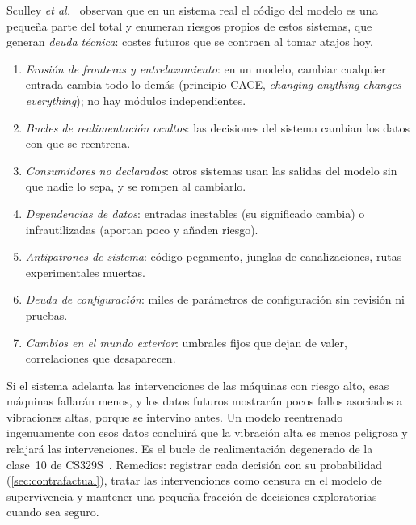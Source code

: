 Sculley \emph{et al.}~\cite{sculley} observan que en un sistema real el código del modelo es una pequeña parte del total y enumeran riesgos propios de estos sistemas, que generan \emph{deuda técnica}: costes futuros que se contraen al tomar atajos hoy.

\begin{definicion}\label{def:deuda}
\begin{enumerate}[label=(\alph*)]
  \item \emph{Erosión de fronteras y entrelazamiento}: en un modelo, cambiar cualquier entrada cambia todo lo demás (principio CACE, \emph{changing anything changes everything}); no hay módulos independientes.
  \item \emph{Bucles de realimentación ocultos}: las decisiones del sistema cambian los datos con que se reentrena.
  \item \emph{Consumidores no declarados}: otros sistemas usan las salidas del modelo sin que nadie lo sepa, y se rompen al cambiarlo.
  \item \emph{Dependencias de datos}: entradas inestables (su significado cambia) o infrautilizadas (aportan poco y añaden riesgo).
  \item \emph{Antipatrones de sistema}: código pegamento, junglas de canalizaciones, rutas experimentales muertas.
  \item \emph{Deuda de configuración}: miles de parámetros de configuración sin revisión ni pruebas.
  \item \emph{Cambios en el mundo exterior}: umbrales fijos que dejan de valer, correlaciones que desaparecen.
\end{enumerate}
\end{definicion}

\begin{observacion}\label{obs:bucle}
Si el sistema adelanta las intervenciones de las máquinas con riesgo alto, esas máquinas fallarán menos, y los datos futuros mostrarán pocos fallos asociados a vibraciones altas, porque se intervino antes. Un modelo reentrenado ingenuamente con esos datos concluirá que la vibración alta es menos peligrosa y relajará las intervenciones. Es el bucle de realimentación degenerado de la clase~10 de CS329S~\cite{cs329s}. Remedios: registrar cada decisión con su probabilidad (\cref{sec:contrafactual}), tratar las intervenciones como censura en el modelo de supervivencia y mantener una pequeña fracción de decisiones exploratorias cuando sea seguro.
\end{observacion}

